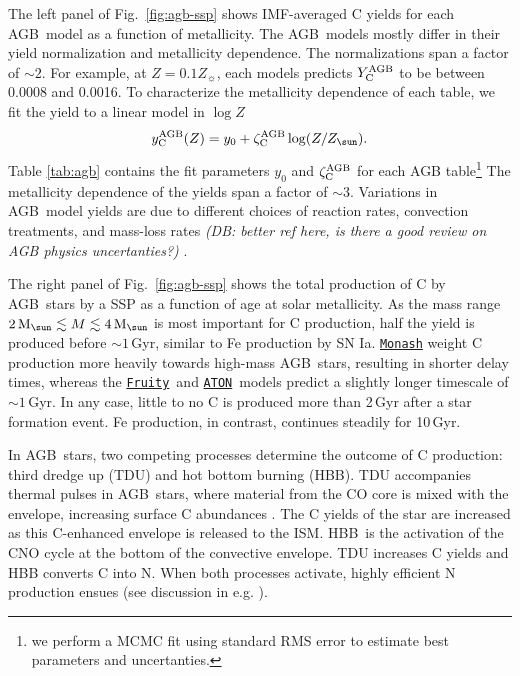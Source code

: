 \documentclass[fleqn,
usenatbib]{mnras}
\makeatletter
\newcommand{\fruity}{\texttt{\hyperlink{fruity}{Fruity}}}
\newcommand{\monash}{\texttt{\hyperlink{monash}{Monash}}}
\newcommand{\aton}{\texttt{\hyperlink{aton}{ATON}}}
\newcommand{\agb}{AGB}
\newcommand{\ia}{SN Ia}
\newcommand{\C}[1][\@nil]{
    \def\tmp{#1}%
    \ifx\tmp\@nnil%
        \ensuremath{\rm C}%
    \else%
        \ifmmode ^{#1}{\rm C}%
        \else $^{#1}$C%
        \fi%
\fi }
\newcommand{\zagb}{\zeta_{\rm C}^{\rm AGB}}
\newcommand{\Mo}{ {\rm M}_{\sun}}
\newcommand{\Zo}{ Z_{\sun}}
\newcommand{\about}[1]{${\sim} #1$}
\newcommand{\dbnote}[1]{ {\color{Thistle} \textit{\small (DB: #1)}} }
\makeatother
\begin{document}
The left panel of Fig.~\ref{fig:agb-ssp} shows IMF-averaged C yields for each \agb\ model as a function of metallicity.
The \agb\ models mostly differ in their yield normalization and metallicity dependence.  
The normalizations span a factor of \about{2}.
For example, at $Z = 0.1\Zo$, each models predicts $Y_{\rm C}^{\rm AGB}$ to be between 0.0008 and
0.0016.
To characterize the metallicity dependence of each table, we fit the yield to a linear model in $\log Z$
\begin{equation}\label{eq:agb_z_approx}
    y_{\rm C}^{\rm AGB}(Z) = y_0 + \zagb \log(Z / \Zo).
\end{equation}
Table \ref{tab:agb} contains the fit parameters $y_0$ and $\zagb$ for each AGB table\footnote{we perform a MCMC fit using standard RMS error to estimate best parameters and uncertanties.}
The metallicity dependence of the yields span a factor of \about{3}.
Variations in \agb\ model yields are due to different choices of reaction rates, convection treatments, and mass-loss rates \citet{ventura+15} \dbnote{better ref here, is there a good review on AGB physics uncertanties?}.



The right panel of Fig.~\ref{fig:agb-ssp} shows the total production of C by \agb\ stars by a SSP as a function of age at solar metallicity. 
As the mass range $2\,\Mo\lesssim M \lesssim 4\,\Mo$ is most important for C production, half the yield is produced before \about{1}\,Gyr, similar to Fe production by \ia. 
\monash{} weight C production more heavily towards high-mass \agb\ stars, resulting in shorter delay times, whereas the \fruity\ and \aton\ models predict a slightly longer timescale of \about{1}\,Gyr. In any case, little to no C is produced more than 2\,Gyr after a star formation event. Fe production, in contrast, continues steadily for 10\,Gyr. 

In \agb\ stars, two competing processes determine the outcome of C production: {third dredge up} (TDU) and {hot bottom burning} (HBB).  
TDU accompanies thermal pulses in \agb\ stars, where material from the CO core is mixed with the envelope, increasing surface C abundances \citep{KL14}. The C yields of the star are increased as this C-enhanced envelope is released to the ISM. 
HBB\ is the activation of the CNO cycle at the bottom of the convective envelope. 
TDU increases C yields and HBB converts C into N. When both processes activate, highly efficient N production ensues (see discussion in e.g. \citealt{james+23, ventura+13}). 
\end{document}
